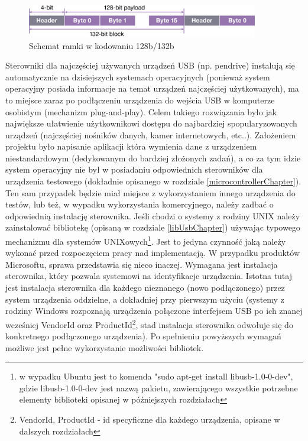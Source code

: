 \documentclass{BscUS}
\begin{document}
\begin{figure}[H]
\centering
\includegraphics[width=0.9\textwidth]{./img/128to132coding}
\caption{Schemat ramki w kodowaniu 128b/132b \cite{128to132coding}}
\label{fig:128to132coding}
\end{figure}
\indent Sterowniki dla najczęściej używanych urządzeń USB (np. pendrive) instalują się automatycznie na dzisiejszych systemach operacyjnych (ponieważ system operacyjny posiada informacje na temat urządzeń najczęściej użytkowanych), ma to miejsce zaraz po podłączeniu urządzenia do wejścia USB w komputerze osobistym (mechanizm plug-and-play). Celem takiego rozwiązania było jak największe ułatwienie użytkownikowi dostępu do najbardziej spopularyzowanych urządzeń (najczęściej nośników danych, kamer internetowych, etc..). Założeniem projektu było napisanie aplikacji która wymienia dane z urządzeniem niestandardowym (dedykowanym do bardziej złożonych zadań), a co za tym idzie system operacyjny nie był w posiadaniu odpowiednich sterowników dla urządzenia testowego (dokładnie opisanego w rozdziale \ref{microcontrollerChapter}). Ten sam przypadek będzie miał miejsce z wykorzystaniem innego urządzenia do testów, lub też, w wypadku wykorzystania komercyjnego, należy zadbać o odpowiednią instalację sterownika. Jeśli chodzi o systemy z rodziny UNIX należy zainstalować bibliotekę (opisaną w rozdziale \ref{libUsbChapter}) używając typowego mechanizmu dla systemów UNIXowych\footnote{w wypadku Ubuntu jest to komenda "sudo apt-get install libusb-1.0-0-dev", gdzie libusb-1.0-0-dev jest nazwą pakietu, zawierającego wszystkie potrzebne elementy biblioteki opisanej w późniejszych rozdziałach}. Jest to jedyna czynność jaką należy wykonać przed rozpoczęciem pracy nad implementacją. W przypadku produktów Microsoftu, sprawa przedstawia się nieco inaczej. Wymagana jest instalacja sterownika, który pozwala systemowi na identyfikacje urządzenia. Istotna tutaj jest instalacja sterownika dla każdego nieznanego (nowo podłączonego) przez system urządzenia oddzielne, a dokładniej przy pierwszym użyciu (systemy z rodziny Windows rozpoznają urządzenia połączone interfejsem USB po ich znanej wcześniej VendorId oraz ProductId\footnote{VendorId, ProductId - id specyficzne dla każdego urządzenia, opisane w dalszych rozdziałach}, stad instalacja sterownika odwołuje się do konkretnego podłączonego urządzenia). Po spełnieniu powyższych wymagań możliwe jest pełne wykorzystanie możliwości bibliotek.
\end{document}
